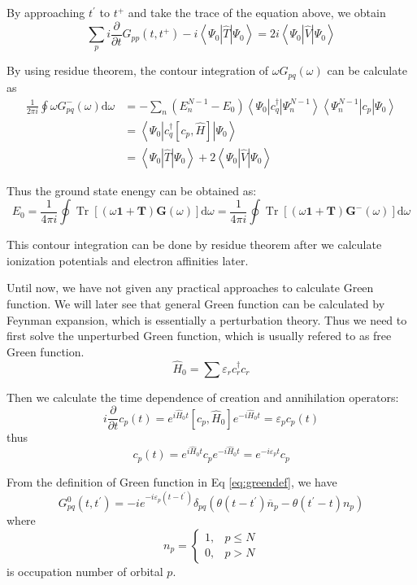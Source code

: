 \documentclass[bachelor, english]{ustcthesis}
\begin{document}
By approaching $t^{\prime}$ to $t^{+}$ and take the trace of the equation above, we obtain
$$
\sum_{p} i \frac{\partial}{\partial t} G_{p p}\left(t, t^{+}\right)-i\left\langle\Psi_{0}|\hat{T}| \Psi_{0}\right\rangle= 2 i\left\langle\Psi_{0}|\hat{V}| \Psi_{0}\right\rangle
$$

By using residue theorem, the contour integration of $\omega G_{pq}(\omega)$ can be calculate as
$$
\begin{aligned}
	\frac{1}{2 \pi i} \oint \omega G_{p q}^{-}(\omega) \mathrm{d} \omega
	&=-\sum_{n}\left(E_{n}^{N-1}-E_{0}\right)\left\langle\Psi_{0}\left|c_{q}^{\dagger}\right| \Psi_{n}^{N-1}\right\rangle\left\langle\Psi_{n}^{N-1}\left|c_{p}\right| \Psi_{0}\right\rangle
\\ 
&=\left\langle\Psi_{0}\left|c_{q}^{\dagger}\left[c_{p}, \hat{H}\right]\right| \Psi_{0}\right\rangle
\\
	&=\left\langle\Psi_{0}|\hat{T}| \Psi_{0}\right\rangle+ 2\left\langle\Psi_{0}|\hat{V}| \Psi_{0}\right\rangle
\end{aligned}
$$

Thus the ground state enengy can be obtained as:
$$
E_{0}=\frac{1}{4 \pi i} \oint \operatorname{Tr}[(\omega \mathbf{1}+\boldsymbol{T}) \boldsymbol{G}(\omega)] \mathrm{d} \omega=\frac{1}{4 \pi i} \oint \operatorname{Tr}\left[(\omega \mathbf{1}+\boldsymbol{T}) \boldsymbol{G}^{-}(\omega)\right] \mathrm{d} \omega
$$

This contour integration can be done by residue theorem after we calculate ionization potentials and electron affinities later.

Until now, we have not given any practical approaches to calculate Green function.
We will later see that general Green function can be calculated by Feynman expansion, which is essentially a perturbation theory.
Thus we need to first solve the unperturbed Green function, which is usually refered to as free Green function.
$$
\hat{H}_{0}=\sum \varepsilon_{r} c_{r}^{\dagger} c_{r}
$$

Then we calculate the time dependence of creation and annihilation operators:
$$
i \frac{\partial}{\partial t} c_{p}(t)=e^{i \hat{H}_{0} t}\left[c_{p}, \hat{H}_{0}\right] e^{-i \hat{H}_{0} t}=\varepsilon_{p} c_{p}(t)
$$
thus
$$
c_{p}(t)=e^{i \hat{H}_{0} t} c_{p} e^{-i \hat{H}_{0} t}=e^{-i \varepsilon_{p} t} c_{p}
$$

From the definition of Green function in Eq \ref{eq:greendef}, we have 
$$
G_{p q}^{0}\left(t, t^{\prime}\right)=-i e^{-i \varepsilon_{p}\left(t-t^{\prime}\right)} \delta_{p q}\left(\theta\left(t-t^{\prime}\right) \overline{n}_{p}-\theta\left(t^{\prime}-t\right) n_{p}\right)
$$
where
$$
n_{p}=
\left\{
\begin{array}{ll}
	{1,} & {p \leq N}
	\\
	{0,} & {p>N}
\end{array}
\right.
$$
is occupation number of orbital $p$.
\end{document}
